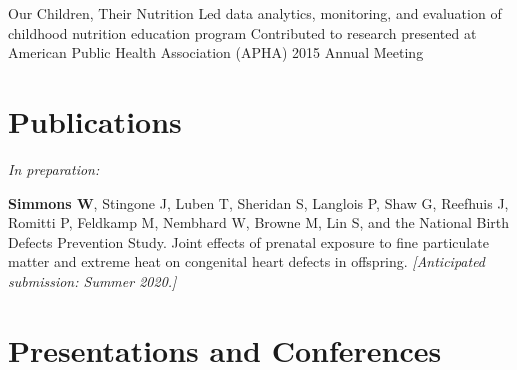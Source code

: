 \documentclass[hidelinks,10pt]{my_cv}
\begin{document}
{	
	{Our Children, Their Nutrition}
	\subitemss
		{Led data analytics, monitoring, and evaluation of childhood nutrition education program}
		{Contributed to research presented at American Public Health Association (APHA) 2015 Annual Meeting}



\section{Publications}

	\textit{In preparation:}

		\vspace{1mm}
		
		\begin{adjustwidth}{2.5em}{0pt}

		{\textbf{Simmons W}, Stingone J, Luben T, Sheridan S, Langlois P, Shaw G, Reefhuis J, Romitti P, Feldkamp M, Nembhard W, Browne M, Lin S, and the National Birth Defects Prevention Study. Joint effects of prenatal exposure to fine particulate matter and extreme heat on congenital heart defects in offspring. \textit{   [Anticipated submission: Summer 2020.]}}

		\end{adjustwidth}

\section{Presentations and Conferences}

}
\end{document}
